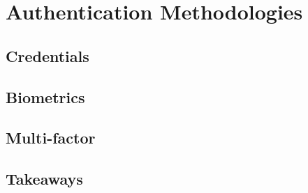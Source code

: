 \section{Authentication Methodologies}

\subsection{Credentials}

\subsection{Biometrics}

\subsection{Multi-factor}

\subsection{Takeaways}